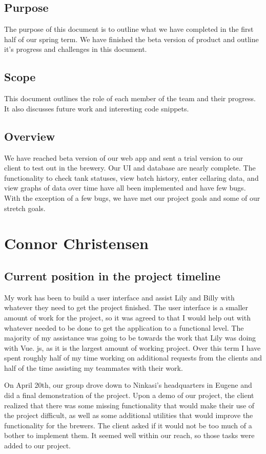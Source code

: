 \documentclass[draftclsnofoot,onecolumn,letterpaper,10pt,compsoc]{IEEEtran}
\begin{document}
\subsection{Purpose}
The purpose of this document is to outline what we have completed in the first half of our spring term.
We have finished the beta version of product and outline it's progress and challenges in this document.
\subsection{Scope}
This document outlines the role of each member of the team and their progress.
It also discusses future work and interesting code snippets.
\subsection{Overview}
We have reached beta version of our web app and sent a trial version to our client to test out in the brewery.
Our UI and database are nearly complete.
The functionality to check tank statuses, view batch history, enter cellaring data, and view graphs of data over time have all been implemented and have few bugs.
With the exception of a few bugs, we have met our project goals and some of our stretch goals.
\section{Connor Christensen}
\subsection{Current position in the project timeline}

My work has been to build a user interface and assist Lily and Billy with whatever they need to get the project finished.
The user interface is a smaller amount of work for the project, so it was agreed to that I would help out with whatever needed to be done to get the application to a functional level.
The majority of my assistance was going to be towards the work that Lily was doing with Vue.
js, as it is the largest amount of working project.
Over this term I have spent roughly half of my time working on additional requests from the clients and half of the time assisting my teammates with their work.


On April 20th, our group drove down to Ninkasi's headquarters in Eugene and did a final demonstration of the project.
Upon a demo of our project, the client realized that there was some missing functionality that would make their use of the project difficult, as well as some additional utilities that would improve the functionality for the brewers.
The client asked if it would not be too much of a bother to implement them.
It seemed well within our reach, so those tasks were added to our project.
\end{document}
